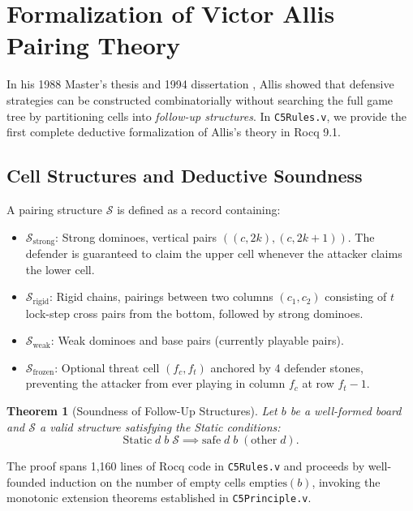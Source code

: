 \documentclass[11pt,reqno]{amsart}
\theoremstyle{plain}
\newtheorem{theorem}{Theorem}[section]
\theoremstyle{definition}
\theoremstyle{remark}
\begin{document}
\section{Formalization of Victor Allis Pairing Theory}

In his 1988 Master's thesis \cite{allis1988knowledge} and 1994 dissertation \cite{allis1994searching}, Allis showed that defensive strategies can be constructed combinatorially without searching the full game tree by partitioning cells into \emph{follow-up structures}. In \texttt{C5Rules.v}, we provide the first complete deductive formalization of Allis's theory in Rocq 9.1.

\subsection{Cell Structures and Deductive Soundness}
A pairing structure $\mathcal{S}$ is defined as a record containing:
\begin{itemize}
    \item $\mathcal{S}_{\text{strong}}$: Strong dominoes, vertical pairs $( (c, 2k), (c, 2k+1) )$. The defender is guaranteed to claim the upper cell whenever the attacker claims the lower cell.
    \item $\mathcal{S}_{\text{rigid}}$: Rigid chains, pairings between two columns $(c_1, c_2)$ consisting of $t$ lock-step cross pairs from the bottom, followed by strong dominoes.
    \item $\mathcal{S}_{\text{weak}}$: Weak dominoes and base pairs (currently playable pairs).
    \item $\mathcal{S}_{\text{frozen}}$: Optional threat cell $(f_c, f_t)$ anchored by 4 defender stones, preventing the attacker from ever playing in column $f_c$ at row $f_t - 1$.
\end{itemize}

\begin{theorem}[Soundness of Follow-Up Structures]
\label{thm:structure_sound}
Let $b$ be a well-formed board and $\mathcal{S}$ a valid structure satisfying the Static conditions:
$$\text{Static}\; d\; b\; \mathcal{S} \implies \text{safe}\; d\; b\; (\text{other}\; d).$$
\end{theorem}
The proof spans 1,160 lines of Rocq code in \texttt{C5Rules.v} and proceeds by well-founded induction on the number of empty cells $\text{empties}(b)$, invoking the monotonic extension theorems established in \texttt{C5Principle.v}.
\end{document}
